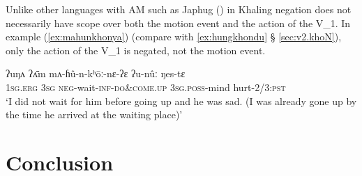 \documentclass[oneside,a4paper,11pt]{article}
\newcommand{\ipa}[1]{{\phon#1}}
\begin{document}
Unlike other languages with AM such as Japhug (\citealt[202-203]{jacques13harmonization}) in Khaling negation does not necessarily have scope over both the motion event and the action of the V_1. In example (\ref{ex:mahunkhonya}) (compare with \ref{ex:hungkhondu} § \ref{sec:v2.khoN}), only the action of the V_1 is negated, not the motion event.  


\begin{exe}
\ex \label{ex:mahunkhonya}
 \gll
\ipa{ʔuŋʌ} \ipa{ʔʌ̄m} \ipa{mʌ-ɦû-n-kʰōː-nɛ-ʔɛ} \ipa{ʔu-nûː} \ipa{ŋes-tɛ} \\
\textsc{1sg}.\textsc{erg} \textsc{3sg} \textsc{neg}-wait-\textsc{inf}-\textsc{do\&come.up} \textsc{3sg}.\textsc{poss}-mind hurt-2/3:\textsc{pst} \\
\glt `I did not wait for him before going up and he was sad. (I was already gone up by the time he arrived at the waiting place)'
\end{exe}

\section{Conclusion}



\end{document}
